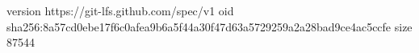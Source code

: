 version https://git-lfs.github.com/spec/v1
oid sha256:8a57cd0ebe17f6c0afea9b6a5f44a30f47d63a5729259a2a28bad9ce4ac5ccfe
size 87544
